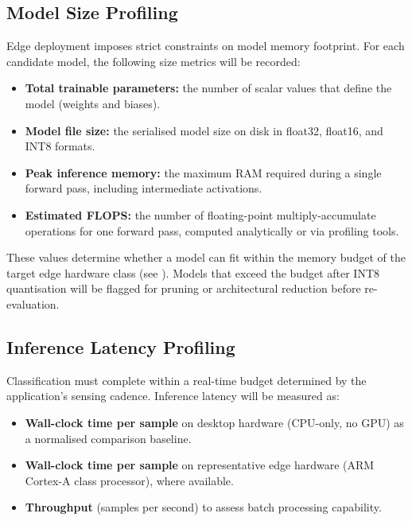 \subsection{Model Size Profiling}
\label{subsec:model_size}

Edge deployment imposes strict constraints on model memory footprint.
For each candidate model, the following size metrics will be recorded:
%
\begin{itemize}
  \item \textbf{Total trainable parameters:} the number of scalar
        values that define the model (weights and biases).
  \item \textbf{Model file size:} the serialised model size on disk
        in float32, float16, and INT8 formats.
  \item \textbf{Peak inference memory:} the maximum RAM required during
        a single forward pass, including intermediate activations.
  \item \textbf{Estimated FLOPS:} the number of floating-point
        multiply-accumulate operations for one forward pass, computed
        analytically or via profiling tools.
\end{itemize}

These values determine whether a model can fit within the memory budget
of the target edge hardware class (see ).  Models
that exceed the budget after INT8 quantisation will be flagged for
pruning or architectural reduction before re-evaluation.


\subsection{Inference Latency Profiling}
\label{subsec:latency}

Classification must complete within a real-time budget determined by
the application's sensing cadence.  Inference latency will be measured
as:
%
\begin{itemize}
  \item \textbf{Wall-clock time per sample} on desktop hardware
        (CPU-only, no GPU) as a normalised comparison baseline.
  \item \textbf{Wall-clock time per sample} on representative edge
        hardware (ARM Cortex-A class processor), where available.
  \item \textbf{Throughput} (samples per second) to assess batch
        processing capability.
\end{itemize}

